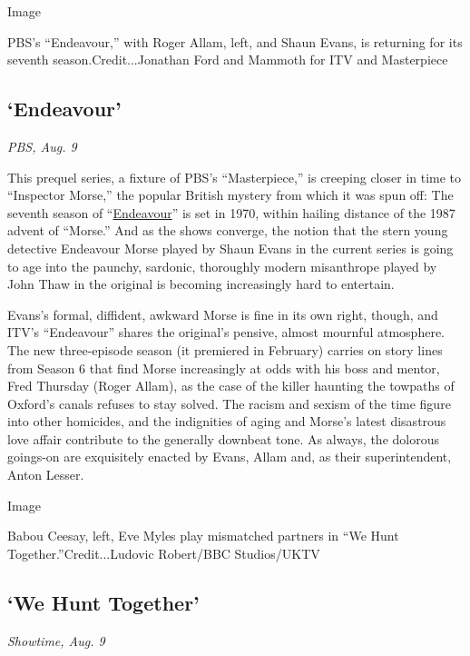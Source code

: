 Image

PBS's ``Endeavour,'' with Roger Allam, left, and Shaun Evans, is
returning for its seventh season.Credit...Jonathan Ford and Mammoth for
ITV and Masterpiece

\hypertarget{endeavour}{%
\subsection{`Endeavour'}\label{endeavour}}

\emph{PBS, Aug. 9}

This prequel series, a fixture of PBS's ``Masterpiece,'' is creeping
closer in time to ``Inspector Morse,'' the popular British mystery from
which it was spun off: The seventh season of
``\href{https://www.nytimes3xbfgragh.onion/2012/06/30/arts/television/inspector-morse-returns-in-endeavour-a-prequel.html?searchResultPosition=2}{Endeavour}''
is set in 1970, within hailing distance of the 1987 advent of ``Morse.''
And as the shows converge, the notion that the stern young detective
Endeavour Morse played by Shaun Evans in the current series is going to
age into the paunchy, sardonic, thoroughly modern misanthrope played by
John Thaw in the original is becoming increasingly hard to entertain.

Evans's formal, diffident, awkward Morse is fine in its own right,
though, and ITV's ``Endeavour'' shares the original's pensive, almost
mournful atmosphere. The new three-episode season (it premiered in
February) carries on story lines from Season 6 that find Morse
increasingly at odds with his boss and mentor, Fred Thursday (Roger
Allam), as the case of the killer haunting the towpaths of Oxford's
canals refuses to stay solved. The racism and sexism of the time figure
into other homicides, and the indignities of aging and Morse's latest
disastrous love affair contribute to the generally downbeat tone. As
always, the dolorous goings-on are exquisitely enacted by Evans, Allam
and, as their superintendent, Anton Lesser.

Image

Babou Ceesay, left, Eve Myles play mismatched partners in ``We Hunt
Together.''Credit...Ludovic Robert/BBC Studios/UKTV

\hypertarget{we-hunt-together}{%
\subsection{`We Hunt Together'}\label{we-hunt-together}}

\emph{Showtime, Aug. 9}

